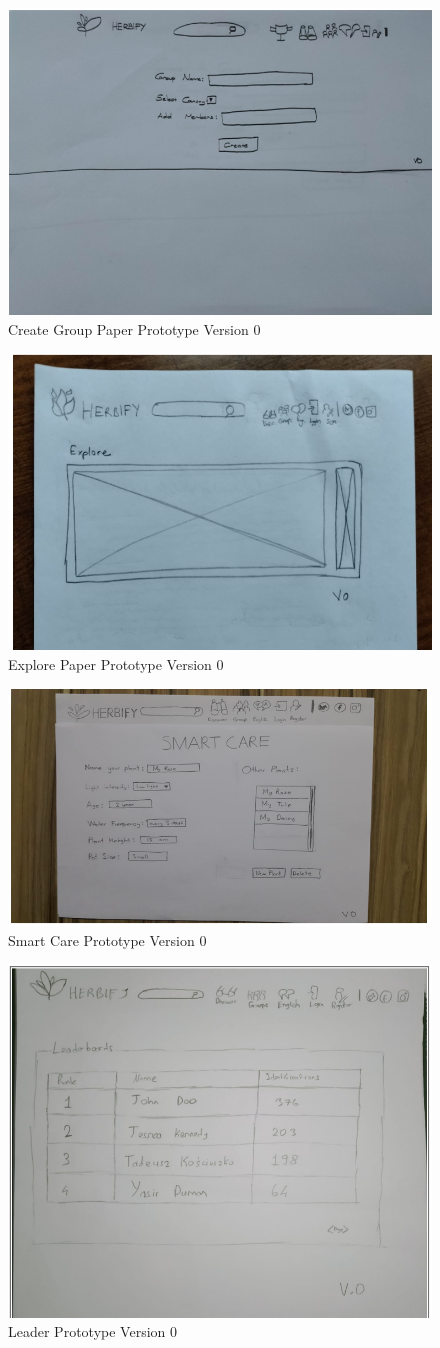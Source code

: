 \documentclass[conference]{IEEEtran}
\begin{document}
\begin{figure}[H]
\centerline{\includegraphics[width=0.48 \textwidth]{images/create0.png}}
\caption{Create Group Paper Prototype Version 0}
\label{fig:graph1}
\end{figure}


\begin{figure}[H]
\centerline{\includegraphics[width=0.48 \textwidth]{images/explore0.png}}
\caption{Explore Paper Prototype Version 0}
\label{fig:graph1}
\end{figure}

\begin{figure}[H]
\centerline{\includegraphics[width=0.48 \textwidth]{images/smartcare0.png}}
\caption{Smart Care Prototype Version 0}
\label{fig:graph1}
\end{figure}


\begin{figure}[H]
\centerline{\includegraphics[width=0.48 \textwidth]{images/leader0.png}}
\caption{Leader Prototype Version 0}
\label{fig:graph1}
\end{figure}
\end{document}
